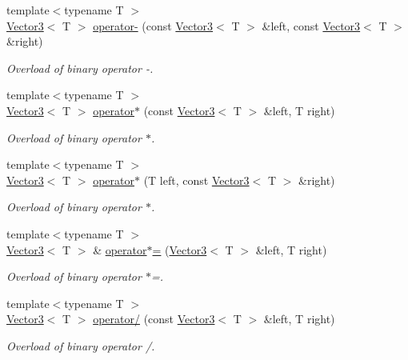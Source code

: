 \begin{DoxyCompactItemize}
{\footnotesize template$<$typename T $>$ }\\\hyperlink{classsf_1_1Vector3}{Vector3}$<$ T $>$ \hyperlink{classsf_1_1Vector3_abe0b9411c00cf807bf8a5f835874bd2a}{operator-\/} (const \hyperlink{classsf_1_1Vector3}{Vector3}$<$ T $>$ \&left, const \hyperlink{classsf_1_1Vector3}{Vector3}$<$ T $>$ \&right)
\begin{DoxyCompactList}\small\item\em Overload of binary operator -\/. \end{DoxyCompactList}\item 
{\footnotesize template$<$typename T $>$ }\\\hyperlink{classsf_1_1Vector3}{Vector3}$<$ T $>$ \hyperlink{classsf_1_1Vector3_a44ec312b31c1a85dcff4863795f98329}{operator$\ast$} (const \hyperlink{classsf_1_1Vector3}{Vector3}$<$ T $>$ \&left, T right)
\begin{DoxyCompactList}\small\item\em Overload of binary operator $\ast$. \end{DoxyCompactList}\item 
{\footnotesize template$<$typename T $>$ }\\\hyperlink{classsf_1_1Vector3}{Vector3}$<$ T $>$ \hyperlink{classsf_1_1Vector3_aa6f2b0d9f79c1b9774759b7087affbb1}{operator$\ast$} (T left, const \hyperlink{classsf_1_1Vector3}{Vector3}$<$ T $>$ \&right)
\begin{DoxyCompactList}\small\item\em Overload of binary operator $\ast$. \end{DoxyCompactList}\item 
{\footnotesize template$<$typename T $>$ }\\\hyperlink{classsf_1_1Vector3}{Vector3}$<$ T $>$ \& \hyperlink{classsf_1_1Vector3_ad5fb972775ce8ab58cd9670789e806a7}{operator$\ast$=} (\hyperlink{classsf_1_1Vector3}{Vector3}$<$ T $>$ \&left, T right)
\begin{DoxyCompactList}\small\item\em Overload of binary operator $\ast$=. \end{DoxyCompactList}\item 
{\footnotesize template$<$typename T $>$ }\\\hyperlink{classsf_1_1Vector3}{Vector3}$<$ T $>$ \hyperlink{classsf_1_1Vector3_ad4ba4a83de236ddeb92a7b759187e90d}{operator/} (const \hyperlink{classsf_1_1Vector3}{Vector3}$<$ T $>$ \&left, T right)
\begin{DoxyCompactList}\small\item\em Overload of binary operator /. \end{DoxyCompactList}\item 

\end{DoxyCompactItemize}
